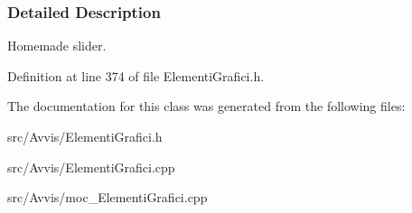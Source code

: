 \subsubsection{\-Detailed \-Description}
\-Homemade slider. 

\-Definition at line 374 of file \-Elementi\-Grafici.\-h.



\-The documentation for this class was generated from the following files\-:\begin{DoxyCompactItemize}
\item 
src/\-Avvis/\-Elementi\-Grafici.\-h\item 
src/\-Avvis/\-Elementi\-Grafici.\-cpp\item 
src/\-Avvis/moc\-\_\-\-Elementi\-Grafici.\-cpp\end{DoxyCompactItemize}
